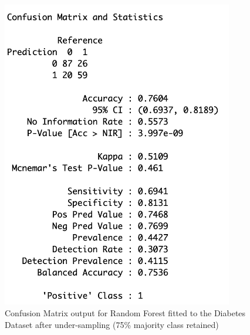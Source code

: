 \begin{figure}[!htbp]
\begin{minipage}{0.45\textwidth}
        \includegraphics[width=0.9\textwidth]{ThesisTemplate/appendix/images/Chapter5Appendix/ConfusionMatrix75/Diabetes.png}
        \caption{Confusion Matrix output for Random Forest fitted to the Diabetes Dataset after under-sampling (75\% majority class retained)}
        \label{fig:matrixDia75}
    \end{minipage}
\end{figure}

